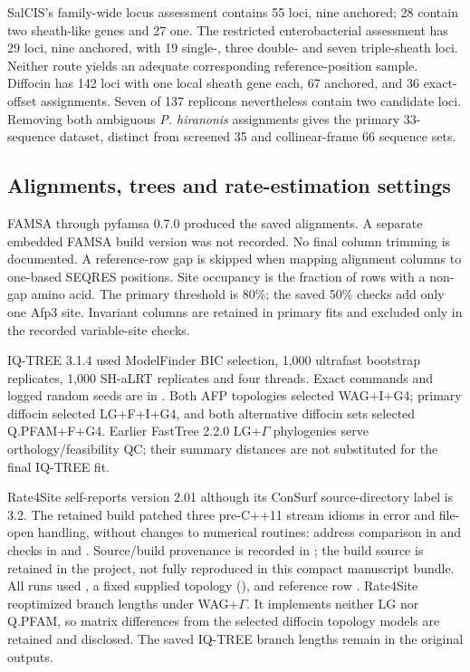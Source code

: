 SalCIS's family-wide locus assessment contains 55 loci, nine anchored; 28 contain two sheath-like genes and 27 one. The restricted enterobacterial assessment has 29 loci, nine anchored, with 19 single-, three double- and seven triple-sheath loci. Neither route yields an adequate corresponding reference-position sample. Diffocin has 142 loci with one local sheath gene each, 67 anchored, and 36 exact-offset assignments. Seven of 137 replicons nevertheless contain two candidate loci. Removing both ambiguous \emph{P. hiranonis} assignments gives the primary 33-sequence dataset, distinct from screened 35 and collinear-frame 66 sequence sets.

\subsection{Alignments, trees and rate-estimation settings}

FAMSA through pyfamsa 0.7.0 produced the saved alignments. A separate embedded FAMSA build version was not recorded. No final column trimming is documented. A reference-row gap is skipped when mapping alignment columns to one-based SEQRES positions. Site occupancy is the fraction of rows with a non-gap amino acid. The primary threshold is 80\%; the saved 50\% checks add only one Afp3 site. Invariant columns are retained in primary fits and excluded only in the recorded variable-site checks.

IQ-TREE 3.1.4 used ModelFinder BIC selection, 1,000 ultrafast bootstrap replicates, 1,000 SH-aLRT replicates and four threads. Exact commands and logged random seeds are in . Both AFP topologies selected WAG+I+G4; primary diffocin selected LG+F+I+G4, and both alternative diffocin sets selected Q.PFAM+F+G4. Earlier FastTree 2.2.0 LG+\ensuremath{\Gamma} phylogenies serve orthology/feasibility QC; their summary distances are not substituted for the final IQ-TREE fit.

Rate4Site self-reports version 2.01 although its ConSurf source-directory label is 3.2. The retained build patched three pre-C++11 stream idioms in error and file-open handling, without changes to numerical routines: address comparison in  and  checks in  and . Source/build provenance is recorded in ; the build source is retained in the project, not fully reproduced in this compact manuscript bundle. All runs used , a fixed supplied topology (), and reference row . Rate4Site reoptimized branch lengths under WAG+\ensuremath{\Gamma}. It implements neither LG nor Q.PFAM, so matrix differences from the selected diffocin topology models are retained and disclosed. The saved IQ-TREE branch lengths remain in the original  outputs.

